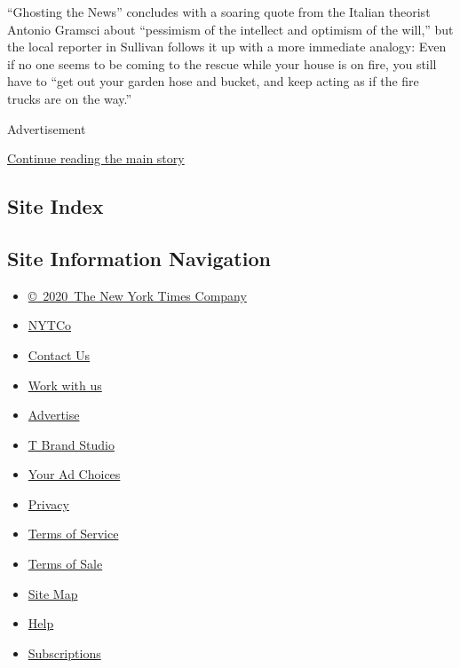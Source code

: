``Ghosting the News'' concludes with a soaring quote from the Italian
theorist Antonio Gramsci about ``pessimism of the intellect and optimism
of the will,'' but the local reporter in Sullivan follows it up with a
more immediate analogy: Even if no one seems to be coming to the rescue
while your house is on fire, you still have to ``get out your garden
hose and bucket, and keep acting as if the fire trucks are on the way.''

Advertisement

\protect\hyperlink{after-bottom}{Continue reading the main story}

\hypertarget{site-index}{%
\subsection{Site Index}\label{site-index}}

\hypertarget{site-information-navigation}{%
\subsection{Site Information
Navigation}\label{site-information-navigation}}

\begin{itemize}
\tightlist
\item
  \href{https://help.nytimes.com/hc/en-us/articles/115014792127-Copyright-notice}{©~2020~The
  New York Times Company}
\end{itemize}

\begin{itemize}
\tightlist
\item
  \href{https://www.nytco.com/}{NYTCo}
\item
  \href{https://help.nytimes.com/hc/en-us/articles/115015385887-Contact-Us}{Contact
  Us}
\item
  \href{https://www.nytco.com/careers/}{Work with us}
\item
  \href{https://nytmediakit.com/}{Advertise}
\item
  \href{http://www.tbrandstudio.com/}{T Brand Studio}
\item
  \href{https://www.nytimes.com/privacy/cookie-policy\#how-do-i-manage-trackers}{Your
  Ad Choices}
\item
  \href{https://www.nytimes.com/privacy}{Privacy}
\item
  \href{https://help.nytimes.com/hc/en-us/articles/115014893428-Terms-of-service}{Terms
  of Service}
\item
  \href{https://help.nytimes.com/hc/en-us/articles/115014893968-Terms-of-sale}{Terms
  of Sale}
\item
  \href{https://spiderbites.nytimes.com}{Site Map}
\item
  \href{https://help.nytimes.com/hc/en-us}{Help}
\item
  \href{https://www.nytimes.com/subscription?campaignId=37WXW}{Subscriptions}
\end{itemize}
